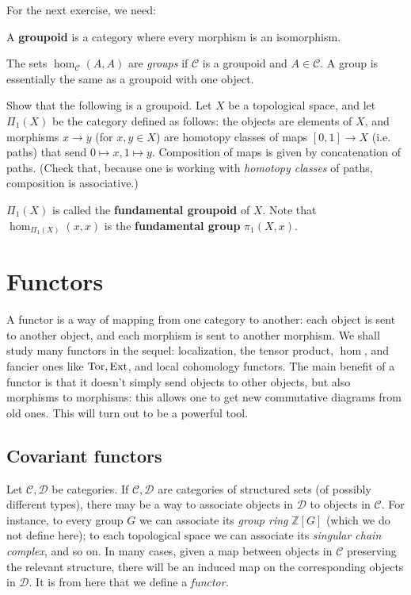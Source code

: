For the next exercise, we need:
\begin{definition}
A \textbf{groupoid} is a category where every morphism is an isomorphism.
\end{definition}
\begin{exercise} 
 The
sets $\hom_{\mathcal{C}}(A, A)$ are \emph{groups} if $\mathcal{C}$ is a
groupoid and $A \in \mathcal{C}$. A group is essentially the same as a groupoid
with one object. 
\end{exercise}

\begin{exercise}

Show that the following is a groupoid. Let $X$ be a topological space, and let
$\Pi_1(X)$ be the category defined as follows: the objects are elements of $X$,
and morphisms $x \to y$ (for $x,y \in X$) are homotopy classes of maps $[0,1]
\to X$ (i.e. paths) that send $0 \mapsto x, 1 \mapsto y$. Composition of maps
is given by concatenation of paths.
(Check that, because one is working with \emph{homotopy classes} of paths,
composition is associative.)

$\Pi_1(X)$ is called the \textbf{fundamental groupoid} of $X$. Note that
$\hom_{\Pi_1(X)}(x, x)$ is the \textbf{fundamental group} $\pi_1(X, x)$.
\end{exercise} 

\section{Functors}

A functor is a way of mapping from one category to another: each object is sent
to another object, and each morphism is sent to another morphism. We shall
study many functors in the sequel: localization, the tensor product, $\hom$,
and fancier ones like $\operatorname{Tor}, \operatorname{Ext}$, and local cohomology functors.
The main benefit of a functor is that it doesn't simply send objects to
other objects, but also morphisms to morphisms: this allows one to get new commutative
diagrams from old ones.
This will turn out to be a powerful tool.


\subsection{Covariant functors}
Let $\mathcal{C}, \mathcal{D}$ be categories. If $\mathcal{C}, \mathcal{D}$
are categories of structured sets (of possibly different types), there may be a
way to associate objects in $\mathcal{D}$ to objects in $\mathcal{C}$. For
instance, to every group $G$ we can associate its \emph{group ring}
$\mathbb{Z}[G]$
 (which we do not define here); to each topological space we can associate its
 \emph{singular chain complex}, and so on.
In many cases, given a map between objects in $\mathcal{C}$ preserving the
relevant structure, there will be an induced map on the corresponding objects
in $\mathcal{D}$. It is from here that we define a \emph{functor.}

